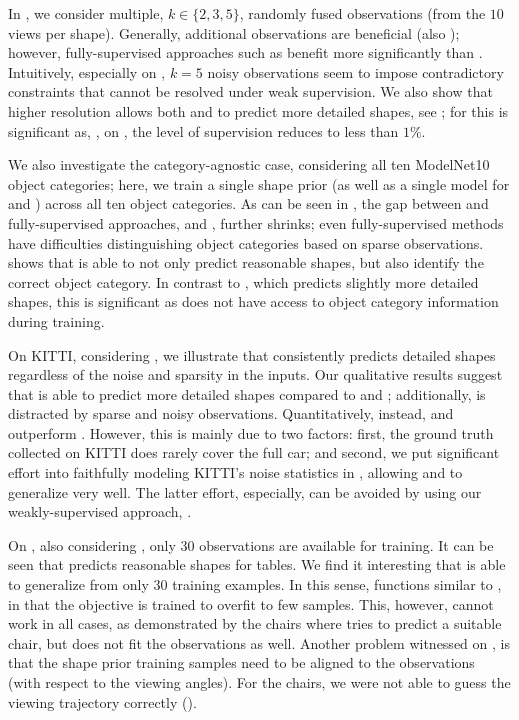 %
In , we consider multiple, $k \in \{2,3,5\}$, randomly fused observations (from the $10$ views per shape). Generally, additional observations are beneficial (also \cf {}); however, fully-supervised approaches such as \Dai benefit more significantly than \AML. Intuitively, especially on \noisy, $k = 5$ noisy observations seem to impose contradictory constraints that cannot be resolved under weak supervision. We also show that higher resolution allows both \AML and \Dai to predict more detailed shapes, see ; for \AML this is significant as, \eg, on \noisy, the level of supervision reduces to less than $1\%$.

%
We also investigate the category-agnostic case, considering all ten ModelNet10 object categories; here, we train a single \DVAE shape prior (as well as a single model for \Dai and \Sup) across all ten object categories. As can be seen in , the gap between \AML and fully-supervised approaches, \Dai and \Sup, further shrinks; even fully-supervised methods have difficulties distinguishing object categories based on sparse observations.  shows that \AML is able to not only predict reasonable shapes, but also identify the correct object category. In contrast to \Dai, which predicts slightly more detailed shapes, this is significant as \AML does not have access to object category information during training.

%
On KITTI, considering , we illustrate that \AML consistently predicts detailed shapes regardless of the noise and sparsity in the inputs. Our qualitative results suggest that \AML is able to predict more detailed shapes compared to \Dai and \Engelmann; additionally, \Engelmann is distracted by sparse and noisy observations. Quantitatively, instead, \Dai and \Sup outperform \AML. However, this is mainly due to two factors: first, the ground truth collected on KITTI does rarely cover the full car; and second, we put significant effort into faithfully modeling KITTI's noise statistics in \noisy, allowing \Dai and \Sup to generalize very well. The latter effort, especially, can be avoided by using our weakly-supervised approach, \AML.

On \Kinect, also considering , only $30$ observations are available for training. It can be seen that \AML predicts reasonable shapes for tables. We find it interesting that \AML is able to generalize from only $30$ training examples. In this sense, \AML functions similar to \ML, in that the objective is trained to overfit to few samples. This, however, cannot work in all cases, as demonstrated by the chairs where \AML tries to predict a suitable chair, but does not fit the observations as well. Another problem witnessed on \Kinect, is that the shape prior training samples need to be aligned to the observations (with respect to the viewing angles). For the chairs, we were not able to guess the viewing trajectory correctly (\cf \citep{Yang2018ARXIVb}).


